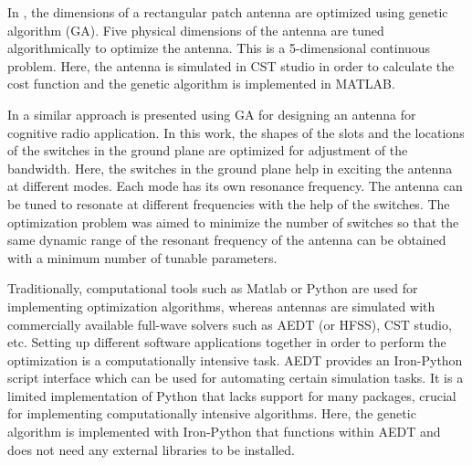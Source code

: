In \cite{patch_miniaturize_ga}, the dimensions of a rectangular patch antenna are optimized using genetic algorithm (GA). Five physical dimensions of the antenna are tuned algorithmically to optimize the antenna. This is a 5-dimensional continuous problem. Here, the antenna is simulated in CST studio in order to calculate the cost function and the genetic algorithm is implemented in MATLAB.

In \cite{freqReconfCogn} a similar approach is presented using GA for designing an antenna for cognitive radio application. In this work, the shapes of the slots and the locations of the switches in the ground plane are optimized for adjustment of the bandwidth. Here, the switches in the ground plane help in exciting the antenna at different modes. Each mode has its own resonance frequency. The antenna can be tuned to resonate at different frequencies with the help of the switches. The optimization problem was aimed to minimize the number of switches so that the same dynamic range of the resonant frequency of the antenna can be obtained with a minimum number of tunable parameters.



Traditionally, computational tools such as Matlab or Python are used for implementing optimization algorithms, whereas antennas are simulated with commercially available full-wave solvers such as AEDT (or HFSS), CST studio, etc. Setting up different software applications together in order to perform the optimization is a computationally intensive task. AEDT provides an Iron-Python script interface which can be used for automating certain simulation tasks. It is a limited implementation of Python that lacks support for many packages, crucial for implementing computationally intensive algorithms. Here, the genetic algorithm is implemented with Iron-Python that functions within AEDT and does not need any external libraries to be installed.

